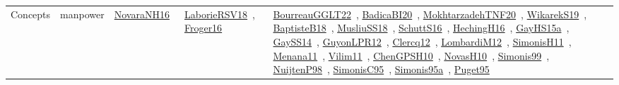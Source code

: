 {\begin{longtable}{lp{3cm}>{\raggedright\arraybackslash}p{6cm}>{\raggedright\arraybackslash}p{6cm}>{\raggedright\arraybackslash}p{8cm}}
Concepts & manpower & \href{works/NovaraNH16.pdf}{NovaraNH16}~\cite{NovaraNH16} & \href{works/LaborieRSV18.pdf}{LaborieRSV18}~\cite{LaborieRSV18}, \href{works/Froger16.pdf}{Froger16}~\cite{Froger16} & \href{works/BourreauGGLT22.pdf}{BourreauGGLT22}~\cite{BourreauGGLT22}, \href{works/BadicaBI20.pdf}{BadicaBI20}~\cite{BadicaBI20}, \href{works/MokhtarzadehTNF20.pdf}{MokhtarzadehTNF20}~\cite{MokhtarzadehTNF20}, \href{works/WikarekS19.pdf}{WikarekS19}~\cite{WikarekS19}, \href{works/BaptisteB18.pdf}{BaptisteB18}~\cite{BaptisteB18}, \href{works/MusliuSS18.pdf}{MusliuSS18}~\cite{MusliuSS18}, \href{works/SchuttS16.pdf}{SchuttS16}~\cite{SchuttS16}, \href{works/HechingH16.pdf}{HechingH16}~\cite{HechingH16}, \href{works/GayHS15a.pdf}{GayHS15a}~\cite{GayHS15a}, \href{works/GaySS14.pdf}{GaySS14}~\cite{GaySS14}, \href{works/GuyonLPR12.pdf}{GuyonLPR12}~\cite{GuyonLPR12}, \href{works/Clercq12.pdf}{Clercq12}~\cite{Clercq12}, \href{works/LombardiM12.pdf}{LombardiM12}~\cite{LombardiM12}, \href{works/SimonisH11.pdf}{SimonisH11}~\cite{SimonisH11}, \href{works/Menana11.pdf}{Menana11}~\cite{Menana11}, \href{works/Vilim11.pdf}{Vilim11}~\cite{Vilim11}, \href{works/ChenGPSH10.pdf}{ChenGPSH10}~\cite{ChenGPSH10}, \href{works/NovasH10.pdf}{NovasH10}~\cite{NovasH10}, \href{works/Simonis99.pdf}{Simonis99}~\cite{Simonis99}, \href{works/NuijtenP98.pdf}{NuijtenP98}~\cite{NuijtenP98}, \href{works/SimonisC95.pdf}{SimonisC95}~\cite{SimonisC95}, \href{works/Simonis95a.pdf}{Simonis95a}~\cite{Simonis95a}, \href{works/Puget95.pdf}{Puget95}~\cite{Puget95}\\

\end{longtable}}
